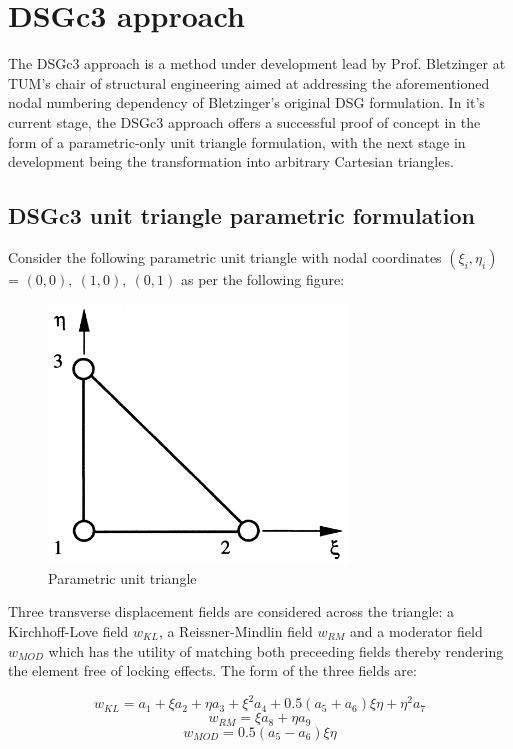 \section{DSGc3 approach}
The DSGc3 approach is a method under development lead by Prof. Bletzinger at TUM's chair of structural engineering aimed at addressing the aforementioned nodal numbering dependency of Bletzinger's original DSG formulation. In it's current stage, the DSGc3 approach offers a successful proof of concept in the form of a parametric-only unit triangle formulation, with the next stage in development being the transformation into arbitrary Cartesian triangles. 

\subsection{DSGc3 unit triangle parametric formulation}
Consider the following parametric unit triangle with nodal coordinates $(\xi_i,\eta_i)$ = $(0,0),\ (1,0),\ (0,1)$ as per the following figure:

\begin{figure}[H]
	\centering
	\includegraphics[width=8cm]{images/parametric_unit_triangle.png}
	\caption{Parametric unit triangle \cite{Ble00}}
	\label{fig:parametric_unit_triangle}
\end{figure}

Three transverse displacement fields are considered across the triangle: a Kirchhoff-Love field $w_{KL}$, a Reissner-Mindlin field $w_{RM}$ and a moderator field $w_{MOD}$ which has the utility of matching both preceeding fields thereby rendering the element free of locking effects. The form of the three fields are:

\begin{equation} 
w_{KL} = a_1 + \xi a_2 + \eta a_3 + \xi^2 a_4 + 0.5(a_5 + a_6)\xi \eta + \eta^2 a_7
\label{eqDSGc3_1}
\end{equation}
\begin{equation} 
w_{RM} = \xi a_8 + \eta a_9
\label{eqDSGc3_2}
\end{equation}
\begin{equation} 
w_{MOD} = 0.5(a_5 - a_6)\xi \eta
\label{eqDSGc3_3}
\end{equation}


